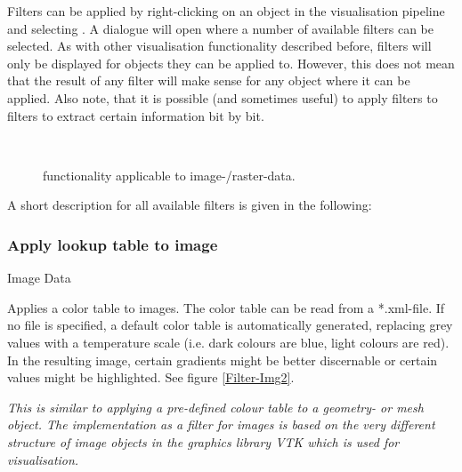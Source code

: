 Filters can be applied by right-clicking on an object in the visualisation pipeline and selecting . A dialogue will open where a number of available filters can be selected. As with other visualisation functionality described before, filters will only be displayed for objects they can be applied to. However, this does not mean that the result of any filter will make sense for any object where it can be applied. Also note, that it is possible (and sometimes useful) to apply filters to filters to extract certain information bit by bit.
%
\begin{figure}[tb]
\begin{center}
\enspace
{} \\
\enspace
{}
\end{center}
\caption{\ogs functionality applicable to image-/raster-data.} \label{fig:filter:raster}
\end{figure}
%
A short description for all available filters is given in the following:

\subsubsection{Apply lookup table to image}
 Image Data

 Applies a color table to images. The color table can be read from a *.xml-file. If no file is specified, a default color table is automatically generated, replacing grey values with a temperature scale (i.e. dark colours are blue, light colours are red). In the resulting image, certain gradients might be better discernable or certain values might be highlighted. See figure \ref{Filter-Img2}.

 \emph{This is similar to applying a pre-defined colour table to a geometry- or mesh object. The implementation as a filter for images is based on the very different structure of image objects in the graphics library VTK which is used for visualisation.}

